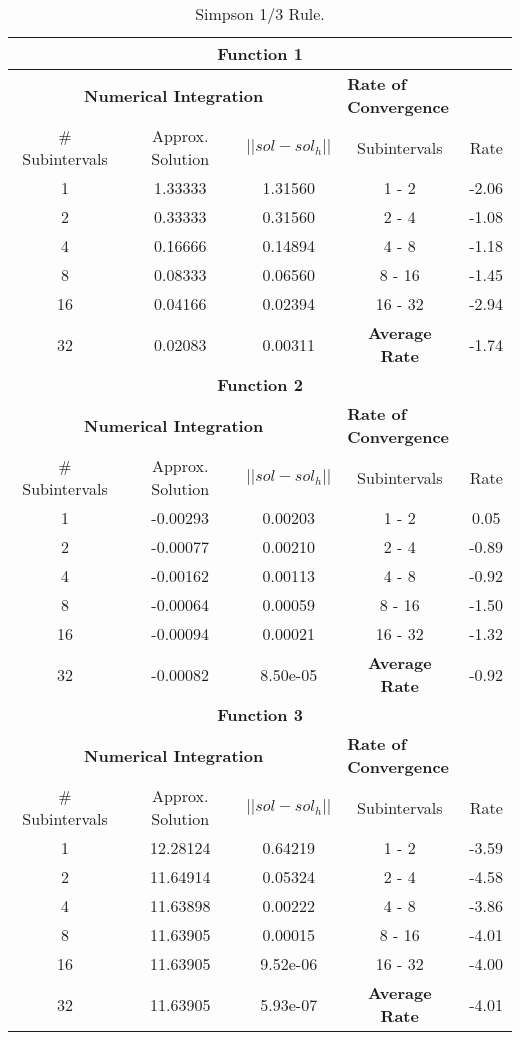 \begin{table}[H]
    \centering
    \caption{Simpson 1/3 Rule.}
    \begin{tabular}{ccccc}
    \hline
    \multicolumn{5}{c}{\textbf{Function 1}} \\
    \hline
    \multicolumn{3}{c}{\textbf{Numerical Integration}} & \multicolumn{2}{l}{\textbf{Rate of Convergence}} \\\hline
    \# Subintervals & Approx. Solution & $|| sol - sol_h ||$ & Subintervals & Rate \\\hline
    1 & 1.33333 & 1.31560 & 1 - 2 &  -2.06\\
    2 & 0.33333 & 0.31560 & 2 - 4 &  -1.08\\
    4 & 0.16666 & 0.14894 & 4 - 8 &  -1.18\\
    8 & 0.08333 & 0.06560 & 8 - 16 &  -1.45\\
    16 & 0.04166 & 0.02394 & 16 - 32 &  -2.94\\
    32 & 0.02083 & 0.00311 & \textbf{Average Rate} & -1.74\\ \hline
    \multicolumn{5}{c}{\textbf{Function 2}} \\
    \hline
    \multicolumn{3}{c}{\textbf{Numerical Integration}} & \multicolumn{2}{l}{\textbf{Rate of Convergence}} \\\hline
    \# Subintervals & Approx. Solution & $|| sol - sol_h ||$ & Subintervals & Rate \\\hline
    1 & -0.00293 & 0.00203 & 1 - 2 &  0.05\\
    2 & -0.00077 & 0.00210 & 2 - 4 &  -0.89\\
    4 & -0.00162 & 0.00113 & 4 - 8 &  -0.92\\
    8 & -0.00064 & 0.00059 & 8 - 16 &  -1.50\\
    16 & -0.00094 & 0.00021 & 16 - 32 &  -1.32\\
    32 & -0.00082 & 8.50e-05 & \textbf{Average Rate} & -0.92\\ \hline
    \multicolumn{5}{c}{\textbf{Function 3}} \\
    \hline
    \multicolumn{3}{c}{\textbf{Numerical Integration}} & \multicolumn{2}{l}{\textbf{Rate of Convergence}} \\\hline
    \# Subintervals & Approx. Solution & $|| sol - sol_h ||$ & Subintervals & Rate \\\hline
    1 & 12.28124 & 0.64219 & 1 - 2 &  -3.59\\
    2 & 11.64914 & 0.05324 & 2 - 4 &  -4.58\\
    4 & 11.63898 & 0.00222 & 4 - 8 &  -3.86\\
    8 & 11.63905 & 0.00015 & 8 - 16 &  -4.01\\
    16 & 11.63905 & 9.52e-06 & 16 - 32 &  -4.00\\
    32 & 11.63905 & 5.93e-07 & \textbf{Average Rate} & -4.01\\ \hline
\end{tabular}
\end{table}

